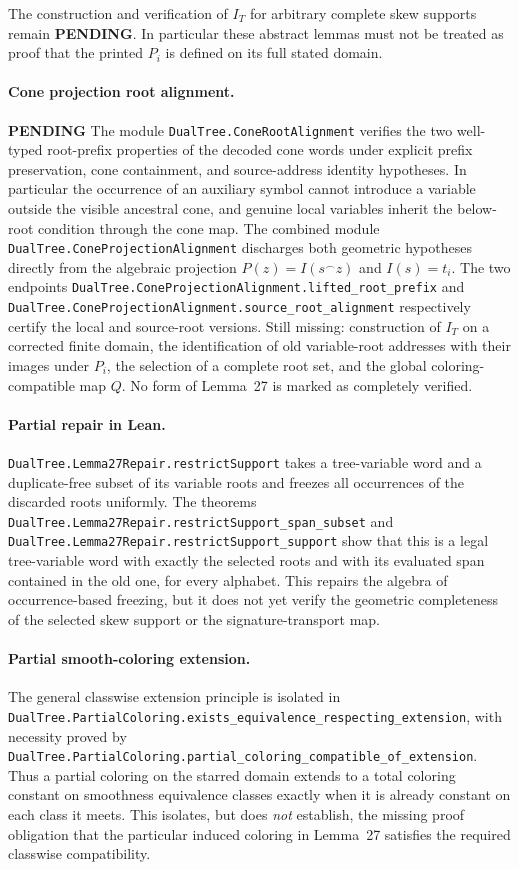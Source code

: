 \documentclass[11pt]{article}
\newcommand{\todo}{\textcolor{gray!70!black}{\textbf{PENDING}}}
\newcommand{\lean}[1]{\texttt{#1}}
\begin{document}
The construction and verification of $I_T$ for arbitrary complete
skew supports remain \todo.  In particular these abstract lemmas
must not be treated as proof that the printed $P_i$ is defined
on its full stated domain.

\paragraph{Cone projection root alignment.} \todo
The module \lean{DualTree.ConeRootAlignment} verifies the two
well-typed root-prefix properties of the decoded cone words under
explicit prefix preservation, cone containment, and source-address
identity hypotheses.  In particular the occurrence of an auxiliary
symbol cannot introduce a variable outside the visible ancestral
cone, and genuine local variables inherit the below-root condition
through the cone map.  The combined module
\lean{DualTree.ConeProjectionAlignment} discharges both geometric
hypotheses directly from the algebraic projection
$P(z)=I(s^\frown z)$ and $I(s)=t_i$.
The two endpoints
\lean{DualTree.ConeProjectionAlignment.lifted_root_prefix} and
\lean{DualTree.ConeProjectionAlignment.source_root_alignment}
respectively certify the local and source-root versions.
Still missing: construction of $I_T$ on a corrected finite domain,
the identification of old variable-root addresses with their
images under $P_i$, the selection of a complete root set, and the
global coloring-compatible map $Q$.  No form of Lemma~27 is marked
as completely verified.

\paragraph{Partial repair in Lean.}
\lean{DualTree.Lemma27Repair.restrictSupport} takes a tree-variable word
and a duplicate-free subset of its variable roots and freezes all occurrences
of the discarded roots uniformly.  The theorems
\lean{DualTree.Lemma27Repair.restrictSupport_span_subset} and
\lean{DualTree.Lemma27Repair.restrictSupport_support} show that this is a
legal tree-variable word with exactly the selected roots and with its evaluated
span contained in the old one, for every alphabet.  This repairs the algebra
of occurrence-based freezing, but it does not yet verify the geometric
completeness of the selected skew support or the signature-transport map.

\paragraph{Partial smooth-coloring extension.}
The general classwise extension principle is isolated in
\lean{DualTree.PartialColoring.exists_equivalence_respecting_extension},
with necessity proved by
\lean{DualTree.PartialColoring.partial_coloring_compatible_of_extension}.
Thus a partial coloring on the starred domain extends to a total coloring
constant on smoothness equivalence classes exactly when it is already
constant on each class it meets.  This isolates, but does \emph{not} establish,
the missing proof obligation that the particular induced coloring in
Lemma~27 satisfies the required classwise compatibility.
\end{document}
